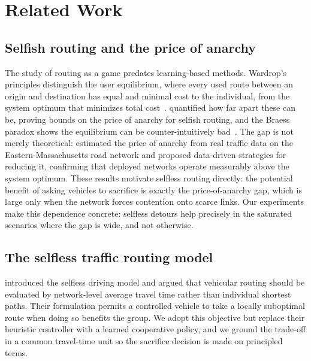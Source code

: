 \section{Related Work}\label{sec:related}

\subsection{Selfish routing and the price of anarchy}
The study of routing as a game predates learning-based methods. Wardrop's principles
distinguish the user equilibrium, where every used route between an origin and
destination has equal and minimal cost to the individual, from the system optimum that
minimizes total cost~\citep{wardrop1952}. \citet{roughgarden2002selfish} quantified how far apart these can be, proving
bounds on the price of anarchy for selfish routing, and the Braess paradox shows the equilibrium can
be counter-intuitively bad~\citep{braess2005paradox}. The gap is not merely theoretical:
\citet{zhang2018poa} estimated the price of anarchy from real traffic data on
the Eastern-Massachusetts road network and proposed data-driven strategies for reducing
it, confirming that deployed networks operate measurably above the system optimum. These
results motivate selfless routing directly: the potential benefit of asking vehicles to sacrifice is exactly the
price-of-anarchy gap, which is large only when the network forces contention onto scarce
links. Our experiments make this dependence concrete: selfless detours help precisely
in the saturated scenarios where the gap is wide, and not otherwise.

\subsection{The selfless traffic routing model}
\citet{dai2019str} introduced the selfless driving model and argued that
vehicular routing should be evaluated by network-level average travel time rather than
individual shortest paths. Their formulation permits a controlled vehicle to take a locally
suboptimal route when doing so benefits the group. We adopt this objective but replace
their heuristic controller with a learned cooperative policy, and we ground the trade-off
in a common travel-time unit so the sacrifice decision is made on principled terms.

